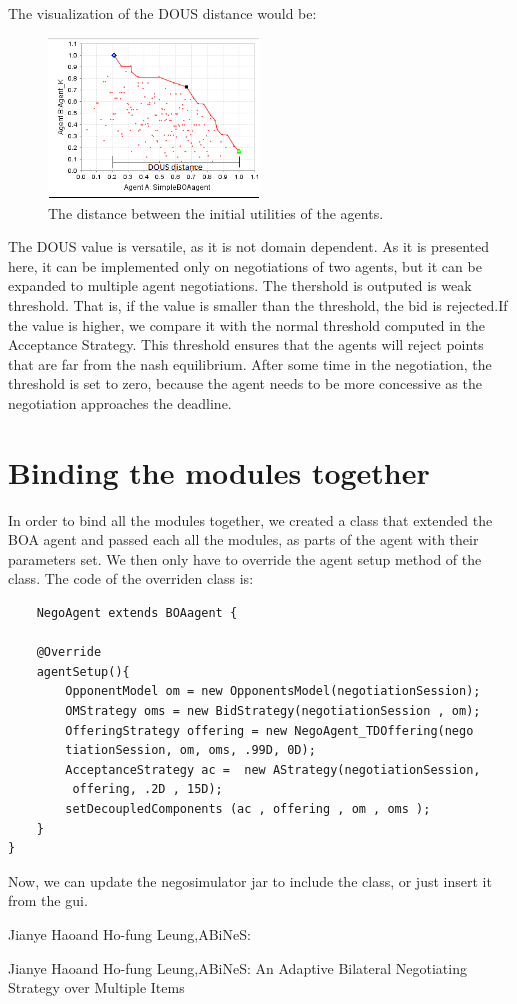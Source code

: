 \documentclass[html]{report}    %
\begin{document}
The visualization of the DOUS distance would be:
\begin{figure}[h!]
  \caption{The distance between the initial utilities of the agents.}
  \centering
    \includegraphics[width=0.5\textwidth]{dous}
\end{figure}


The DOUS value is versatile, as it is not domain dependent.
As it is presented here, it can be implemented only on negotiations of two agents, but it can be expanded to multiple agent negotiations.
The thershold is outputed is weak threshold.
That is, if the value is smaller than the threshold, the bid is rejected.If the value is higher, we compare it with the normal threshold computed in the Acceptance Strategy.
This threshold ensures that the agents will reject points that are far from the nash equilibrium.
After some time in the negotiation, the threshold is set to zero, because the agent needs to be more concessive as the negotiation approaches the deadline. 

\section{Binding the modules together}

In order to bind all the modules together, we created a class that extended the BOA agent and passed each all the modules, as parts of the agent with their parameters set. We then only have to override the agent setup method of the class.  The code of the overriden class is:


\begin{verbatim}
	NegoAgent extends BOAagent {
    
    @Override
    agentSetup(){
        OpponentModel om = new OpponentsModel(negotiationSession);
        OMStrategy oms = new BidStrategy(negotiationSession , om);
        OfferingStrategy offering = new NegoAgent_TDOffering(nego
        tiationSession, om, oms, .99D, 0D);
        AcceptanceStrategy ac =  new AStrategy(negotiationSession,
         offering, .2D , 15D);
        setDecoupledComponents (ac , offering , om , oms );
    }
}
\end{verbatim}
Now, we can update the negosimulator jar to include the class, or just insert it from the gui.







\begin{thebibliography}{5}

 Jianye Haoand Ho-fung Leung,ABiNeS:

 Jianye Haoand Ho-fung Leung,ABiNeS: An Adaptive Bilateral Negotiating Strategy over Multiple Items
\end{thebibliography}
\end{document}
